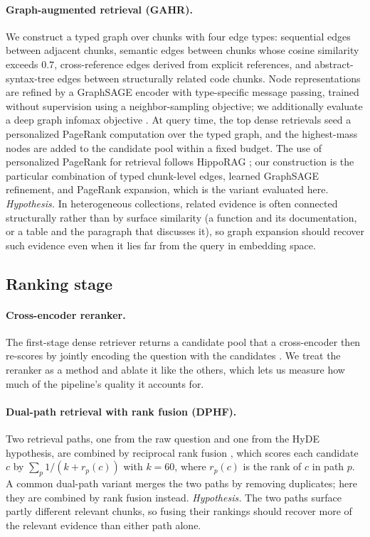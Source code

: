 \documentclass[10pt,twocolumn]{article}
\begin{document}
\paragraph{Graph-augmented retrieval (GAHR).}
We construct a typed graph over chunks with four edge types: sequential edges
between adjacent chunks, semantic edges between chunks whose cosine similarity
exceeds $0.7$, cross-reference edges derived from explicit references, and
abstract-syntax-tree edges between structurally related code chunks. Node
representations are refined by a GraphSAGE encoder \cite{hamilton2017graphsage}
with type-specific message passing, trained without supervision using a
neighbor-sampling objective; we additionally evaluate a deep graph infomax
objective \cite{velickovic2019dgi}. At query time, the top dense retrievals seed a
personalized PageRank computation \cite{haveliwala2002ppr} over the typed graph,
and the highest-mass nodes are added to the candidate pool within a fixed budget.
The use of personalized PageRank for retrieval follows HippoRAG
\cite{gutierrez2024hipporag}; our construction is the particular combination of
typed chunk-level edges, learned GraphSAGE refinement, and PageRank expansion,
which is the variant evaluated here.
\emph{Hypothesis.} In heterogeneous collections, related evidence is often
connected structurally rather than by surface similarity (a function and its
documentation, or a table and the paragraph that discusses it), so graph
expansion should recover such evidence even when it lies far from the query in
embedding space.

\subsection{Ranking stage}
\paragraph{Cross-encoder reranker.}
The first-stage dense retriever returns a candidate pool that a cross-encoder
then re-scores by jointly encoding the question with the candidates
\cite{reimers2019sbert,nogueira2020monot5}. We treat the reranker as a method
and ablate it like the others, which lets us measure how much of the pipeline's
quality it accounts for.

\paragraph{Dual-path retrieval with rank fusion (DPHF).}
Two retrieval paths, one from the raw question and one from the HyDE hypothesis,
are combined by reciprocal rank fusion \cite{cormack2009rrf}, which scores each
candidate $c$ by $\sum_{p} 1/(k + r_p(c))$ with $k{=}60$, where $r_p(c)$ is the
rank of $c$ in path $p$. A common dual-path variant merges the two paths by
removing duplicates; here they are combined by rank fusion instead.
\emph{Hypothesis.} The two paths surface partly different relevant chunks, so
fusing their rankings should recover more of the relevant evidence than either
path alone.
\end{document}
